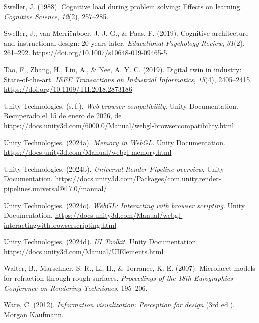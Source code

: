 \begin{list}{}
\item Sweller, J. (1988). Cognitive load during problem solving: Effects on learning. \textit{Cognitive Science}, \textit{12}(2), 257--285.

\item Sweller, J., van Merriënboer, J. J. G., \& Paas, F. (2019). Cognitive architecture and instructional design: 20 years later. \textit{Educational Psychology Review}, \textit{31}(2), 261--292. \url{https://doi.org/10.1007/s10648-019-09465-5}

\item Tao, F., Zhang, H., Liu, A., \& Nee, A. Y. C. (2019). Digital twin in industry: State-of-the-art. \textit{IEEE Transactions on Industrial Informatics}, \textit{15}(4), 2405--2415. \url{https://doi.org/10.1109/TII.2018.2873186}

\item Unity Technologies. (s.\,f.). \textit{Web browser compatibility}. Unity Documentation. Recuperado el 15 de enero de 2026, de \url{https://docs.unity3d.com/6000.0/Manual/webgl-browsercompatibility.html}

\item Unity Technologies. (2024a). \textit{Memory in WebGL}. Unity Documentation. \url{https://docs.unity3d.com/Manual/webgl-memory.html}

\item Unity Technologies. (2024b). \textit{Universal Render Pipeline overview}. Unity Documentation. \url{https://docs.unity3d.com/Packages/com.unity.render-pipelines.universal@17.0/manual/}

\item Unity Technologies. (2024c). \textit{WebGL: Interacting with browser scripting}. Unity Documentation. \url{https://docs.unity3d.com/Manual/webgl-interactingwithbrowserscripting.html}

\item Unity Technologies. (2024d). \textit{UI Toolkit}. Unity Documentation. \url{https://docs.unity3d.com/Manual/UIElements.html}

\item Walter, B., Marschner, S. R., Li, H., \& Torrance, K. E. (2007). Microfacet models for refraction through rough surfaces. \textit{Proceedings of the 18th Eurographics Conference on Rendering Techniques}, 195--206.

\item Ware, C. (2012). \textit{Information visualization: Perception for design} (3rd ed.). Morgan Kaufmann.


\end{list}
